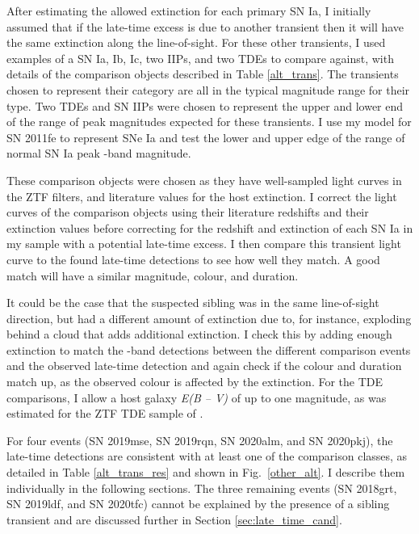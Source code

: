 \documentclass[a4paper,oneside,12pt, class=Latex/Classes/PhDthesisPSnPDF, crop=false]{standalone}
\begin{document}
After estimating the allowed extinction for each primary SN Ia, I initially assumed that if the late-time excess is due to another transient then it will have the same extinction along the line-of-sight. For these other transients, I used examples of a SN Ia, Ib, Ic, two IIPs, and two TDEs to compare against, with details of the comparison objects described in Table \ref{alt_trans}. The transients chosen to represent their category are all in the typical magnitude range for their type. Two TDEs and SN IIPs were chosen to represent the upper and lower end of the range of peak magnitudes expected for these transients. I use my model for SN 2011fe to represent SNe Ia and test the lower and upper edge of the range of normal SN Ia peak \ztfr-band magnitude.

These comparison objects were chosen as they have well-sampled light curves in the ZTF filters, and literature values for the host extinction. I correct the light curves of the comparison objects using their literature redshifts and their extinction values before correcting for the redshift and extinction of each SN Ia in my sample with a potential late-time excess. I then compare this transient light curve to the found late-time detections to see how well they match. A good match will have a similar magnitude, colour, and duration. 

It could be the case that the suspected sibling was in the same line-of-sight direction, but had a different amount of extinction due to, for instance, exploding behind a cloud that adds additional extinction. I check this by adding enough extinction to match the \ztfr-band detections between the different comparison events and the observed late-time detection and again check if the colour and duration match up, as the observed colour is affected by the extinction. For the TDE comparisons, I allow a host galaxy \textit{E(B -- V)} of up to one magnitude, as was estimated for the ZTF TDE sample of \citet{TDE_host_ext_range}.

For four events (SN 2019mse, SN 2019rqn, SN 2020alm, and SN 2020pkj), the late-time detections are consistent with at least one of the comparison classes, as detailed in Table \ref{alt_trans_res} and shown in Fig.~\ref{other_alt}. I describe them individually in the following sections. The three remaining events (SN 2018grt, SN 2019ldf, and SN 2020tfc) cannot be explained by the presence of a sibling transient and are discussed further in Section \ref{sec:late_time_cand}.\\
\end{document}
